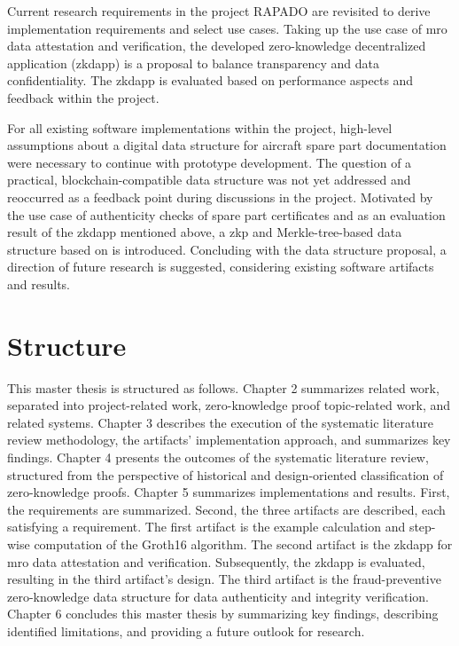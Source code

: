 Current research requirements in the project RAPADO are revisited to derive implementation requirements and select use cases. Taking up the use case of \acrshort{mro} data attestation and verification, the developed zero-knowledge decentralized application (\acrshort{zkdapp}) is a proposal to balance transparency and data confidentiality. The \acrshort{zkdapp} is evaluated based on performance aspects and feedback within the project.

For all existing software implementations within the project, high-level assumptions about a digital data structure for aircraft spare part documentation were necessary to continue with prototype development. The question of a practical, blockchain-compatible data structure was not yet addressed and reoccurred as a feedback point during discussions in the project. Motivated by the use case of authenticity checks of spare part certificates and as an evaluation result of the \acrshort{zkdapp} mentioned above, a \acrshort{zkp} and Merkle-tree-based data structure based on \citet{sedlemeirgrenenergy} is introduced. Concluding with the data structure proposal, a direction of future research is suggested, considering existing software artifacts and results.

\section{Structure}
This master thesis is structured as follows. Chapter 2 summarizes related work, separated into project-related work, zero-knowledge proof topic-related work, and related systems. Chapter 3 describes the execution of the systematic literature review methodology, the artifacts' implementation approach, and summarizes key findings. Chapter 4 presents the outcomes of the systematic literature review, structured from the perspective of historical and design-oriented classification of zero-knowledge proofs. Chapter 5 summarizes implementations and results. First, the requirements are summarized. Second, the three artifacts are described, each satisfying a requirement. The first artifact is the example calculation and step-wise computation of the Groth16 algorithm. The second artifact is the \acrshort{zkdapp} for \acrshort{mro} data attestation and verification. Subsequently, the \acrshort{zkdapp} is evaluated, resulting in the third artifact's design. The third artifact is the fraud-preventive zero-knowledge data structure for data authenticity and integrity verification. Chapter 6 concludes this master thesis by summarizing key findings, describing identified limitations, and providing a future outlook for research.

